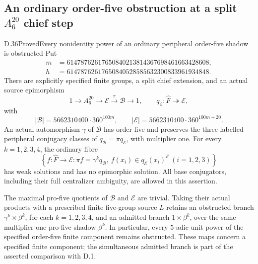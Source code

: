 \subsection{An ordinary order-five obstruction at a split \texorpdfstring{$A_6^{20}$}{A6-power} chief step}

\begin{statement}{D.36}{Proved}{Every nonidentity power of an ordinary peripheral order-five shadow is obstructed}
Put
\[
 \begin{split}
 m&=61478762617650840213814367698461663428608,\\
 h&=61478762617650840528585632300833961934848.
 \end{split}
 \tag{D.36.1}
\]
There are explicitly specified finite groups, a split chief extension,
and an actual source epimorphism
\[
 1\longrightarrow A_6^{20}\longrightarrow\mathcal E
       \xrightarrow{\pi}\mathcal B\longrightarrow1,
 \qquad q_{\mathcal E}:\widehat F\twoheadrightarrow\mathcal E,
 \tag{D.36.2}
\]
with
\[
 |\mathcal B|=5662310400\cdot360^{100m},
 \qquad
 |\mathcal E|=5662310400\cdot360^{100m+20}.
 \tag{D.36.3}
\]
An actual automorphism \(\gamma\) of \(\mathcal B\) has order five and
preserves the three labelled peripheral conjugacy classes of
\(q_{\mathcal B}=\pi q_{\mathcal E}\), with multiplier one.
For every \(k=1,2,3,4\), the ordinary fibre
\[
 \left\{f:\widehat F\longrightarrow\mathcal E:
       \pi f=\gamma^kq_{\mathcal B},\
       f(x_i)\in q_{\mathcal E}(x_i)^{\mathcal E}
       \ (i=1,2,3)\right\}
 \tag{D.36.4}
\]
has weak solutions and has no epimorphic solution.  All base
conjugators, including their full centralizer ambiguity, are allowed
in this assertion.

The maximal pro-five quotients of \(\mathcal B\) and \(\mathcal E\)
are trivial.  Taking their actual products with a prescribed finite
five-group source \(L\) retains an obstructed branch
\(\gamma^k\times\beta^k\), for each \(k=1,2,3,4\), and an admitted
branch \(1\times\beta^k\), over the same multiplier-one pro-five
shadow \(\beta^k\).  In particular, every \(5\)-adic unit power of
the specified order-five finite component remains obstructed.
These maps concern a specified finite component; the simultaneous
admitted branch is part of the asserted comparison with D.1.
\end{statement}

